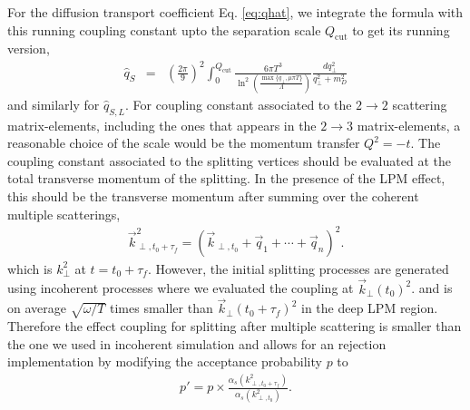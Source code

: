 \documentclass[aps, prc, reprint, amsmath, groupedaddress, nofootinbib]{revtex4-1}
\begin{document}
For the diffusion transport coefficient Eq. \ref{eq:qhat}, we integrate the formula with this running coupling constant upto the separation scale $Q_{\textrm{cut}}$ to get its running version,
\begin{eqnarray}
\hat{q}_S &=& \left(\frac{2\pi}{9}\right)^2\int_{0}^{Q_{\textrm{cut}}} \frac{6\pi T^3}{\ln^2\left(\frac{\max\{q_\perp, \mu\pi T\}}{\Lambda}\right)}\frac{dq_\perp^2}{q_\perp^2 + m_D^2}
\end{eqnarray}
and similarly for $\hat{q}_{S,L}$.
For coupling constant associated to the $2\rightarrow 2$ scattering matrix-elements, including the ones that appears in the $2\rightarrow 3$ matrix-elements, a reasonable choice of the scale would be the momentum transfer $Q^2 = -t$. 
The coupling constant associated to the splitting vertices should be evaluated at the total transverse momentum of the splitting.
In the presence of the LPM effect, this should be the transverse momentum after summing over the coherent multiple scatterings,
\begin{eqnarray}\label{eq:kTn}
\vec{k}_{\perp, t_0+\tau_f}^2 = \left(\vec{k}_{\perp,t_0}+\vec{q}_1+\cdots+\vec{q}_n\right)^2.
\end{eqnarray} 
which is $k_\perp^2$ at $t = t_0 +\tau_f$.
However, the initial splitting processes are generated using incoherent processes where we evaluated the coupling at $\vec{k}_{\perp}(t_0)^2$.
and is on average $\sqrt{\omega/T}$ times smaller than $\vec{k}_{\perp}(t_0+\tau_f)^2$ in the deep LPM region.
Therefore the effect coupling for splitting after multiple scattering is smaller than the one we used in incoherent simulation and allows for an rejection implementation by modifying the acceptance probability $p$ to
\begin{eqnarray}
p' = p\times \frac{\alpha_s(k_{\perp,t_0+\tau_f}^2)}{\alpha_s(k_{\perp,t_0}^2)}.
\end{eqnarray}
\end{document}
